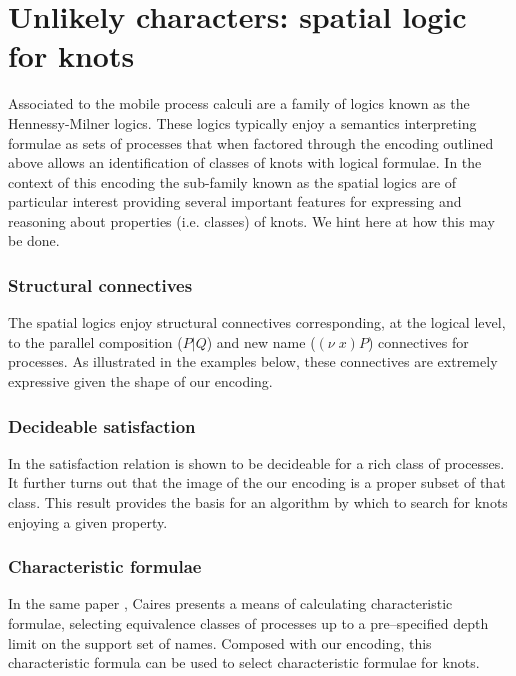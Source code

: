 \section{Unlikely characters: spatial logic for
  knots}\label{sub:characteristic_formulae} %

Associated to the mobile process calculi are a family of logics known
as the Hennessy-Milner logics. These logics typically enjoy a
semantics interpreting formulae as sets of processes that when
factored through the encoding outlined above allows an identification
of classes of knots with logical formulae. In the context of this
encoding the sub-family known as the spatial logics \cite{CairesC03}
\cite{CairesC04} \cite{Caires04} are of particular interest providing
several important features for expressing and reasoning about
properties (i.e. classes) of knots. We hint here at how this may be done.

\subsubsection{Structural connectives} The spatial logics enjoy
structural connectives corresponding, at the logical level, to the
parallel composition ($P | Q$) and new name ($(\nu \; x)P$)
connectives for processes. As illustrated in the examples below, these
connectives are extremely expressive given the shape of our encoding.

\subsubsection{Decideable satisfaction}
In \cite{Caires04} the satisfaction relation is shown to be decideable
for a rich class of processes. It further turns out that the image of
the our encoding is a proper subset of that class. This result
provides the basis for an algorithm by which to search for knots
enjoying a given property.

\subsubsection{Characteristic formulae}
In the same paper \cite{Caires04} , Caires presents a means of calculating
characteristic formulae, selecting equivalence classes of processes
up to a pre--specified depth limit on the support set of names. Composed with our
encoding, this characteristic formula can be used to select
characteristic formulae for knots.

